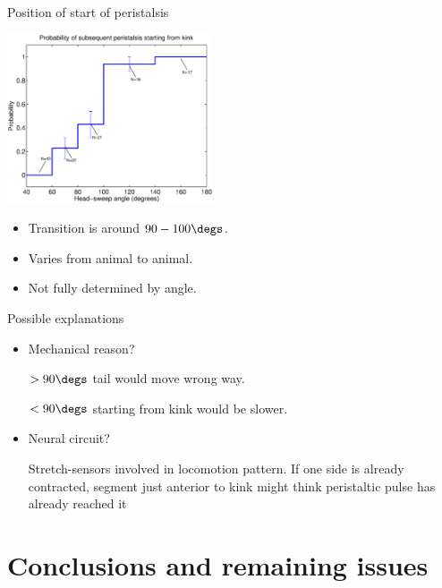 \documentclass{beamer}%
\begin{document}
\begin{frame}{Position of start of peristalsis}
%
 \begin{center}
   \includegraphics[height=5cm]{Figs/ProbKink.eps}
 \end{center}

 \begin{itemize}
 \item Transition is around $90-100\degs$.
 \item Varies from animal to animal.
 \item Not fully determined by angle.
 \end{itemize}
%
\end{frame}


\begin{frame}{Possible explanations}
%
 \begin{itemize}
   \item Mechanical reason?

   $>90\degs$ tail would move wrong way.

   $<90\degs$ starting from kink would be slower.
   \vp

   \item Neural circuit?

   Stretch-sensors involved in locomotion pattern. If one side is already contracted, segment just anterior to kink might think peristaltic pulse has already reached it
 \end{itemize}
%
\end{frame}


\section{Conclusions and remaining issues}
\end{document}
